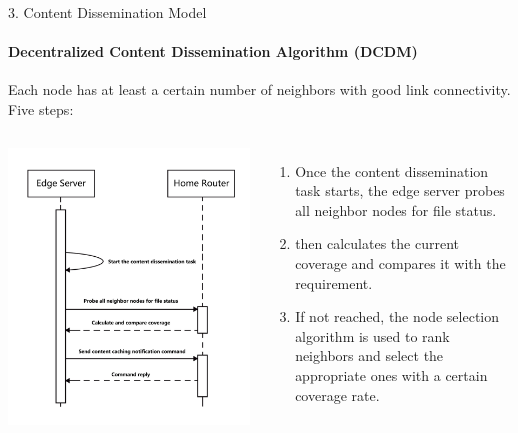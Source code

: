 \documentclass{beamer}		%
\begin{document}
\begin{frame}{3. Content Dissemination Model}
\framesubtitle{Decentralized Content Dissemination Algorithm (DCDM)}
Each node has at least a certain number of neighbors with good link connectivity. Five steps:
\begin{columns}
\includegraphics[scale=0.08]{Figure1.png}
\begin{enumerate}
    \item[1.] Once the content dissemination task starts, the edge server probes all neighbor nodes for file status.
    \item[2.] then calculates the current coverage and compares it with the requirement.
    \item[3.] If not reached, the node selection algorithm is used to rank neighbors and select the appropriate ones with a certain coverage rate.
\end{enumerate}
\end{columns}
\end{frame}
\end{document}
